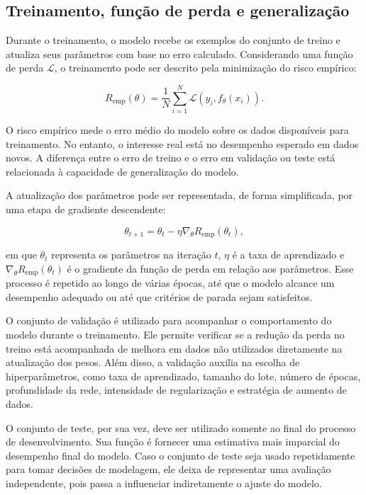 \documentclass[
    12pt,
    openright,
    oneside,
    a4paper,
    english,
    brazil
]{abntex2}
\begin{document}
\subsection{Treinamento, função de perda e generalização}
\label{subsec:treinamento_funcao_perda_generalizacao}

Durante o treinamento, o modelo recebe os exemplos do conjunto de treino e atualiza seus parâmetros com base no erro calculado. Considerando uma função de perda \(\mathcal{L}\), o treinamento pode ser descrito pela minimização do risco empírico:

\[
R_{\text{emp}}(\theta)
=
\frac{1}{N}
\sum_{i=1}^{N}
\mathcal{L}(y_i, f_{\theta}(x_i)).
\]

O risco empírico mede o erro médio do modelo sobre os dados disponíveis para treinamento. No entanto, o interesse real está no desempenho esperado em dados novos. A diferença entre o erro de treino e o erro em validação ou teste está relacionada à capacidade de generalização do modelo.

A atualização dos parâmetros pode ser representada, de forma simplificada, por uma etapa de gradiente descendente:

\[
\theta_{t+1}
=
\theta_t
-
\eta
\nabla_{\theta}
R_{\text{emp}}(\theta_t),
\]

em que \(\theta_t\) representa os parâmetros na iteração \(t\), \(\eta\) é a taxa de aprendizado e \(\nabla_{\theta}R_{\text{emp}}(\theta_t)\) é o gradiente da função de perda em relação aos parâmetros. Esse processo é repetido ao longo de várias épocas, até que o modelo alcance um desempenho adequado ou até que critérios de parada sejam satisfeitos.

O conjunto de validação é utilizado para acompanhar o comportamento do modelo durante o treinamento. Ele permite verificar se a redução da perda no treino está acompanhada de melhora em dados não utilizados diretamente na atualização dos pesos. Além disso, a validação auxilia na escolha de hiperparâmetros, como taxa de aprendizado, tamanho do lote, número de épocas, profundidade da rede, intensidade de regularização e estratégia de aumento de dados.

O conjunto de teste, por sua vez, deve ser utilizado somente ao final do processo de desenvolvimento. Sua função é fornecer uma estimativa mais imparcial do desempenho final do modelo. Caso o conjunto de teste seja usado repetidamente para tomar decisões de modelagem, ele deixa de representar uma avaliação independente, pois passa a influenciar indiretamente o ajuste do modelo.
\end{document}
